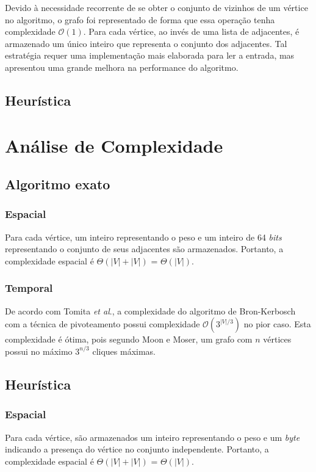 \documentclass{article}
\begin{document}
Devido à necessidade recorrente de se obter o conjunto de vizinhos de um vértice no algoritmo, o grafo foi representado de forma que essa operação tenha complexidade $\mathcal{O}(1)$. Para cada vértice, ao invés de uma lista de adjacentes, é armazenado um único inteiro que representa o conjunto dos adjacentes. Tal estratégia requer uma implementação mais elaborada para ler a entrada, mas apresentou uma grande melhora na performance do algoritmo.

\subsection{Heurística}


\pagebreak


\section{Análise de Complexidade}

\subsection{Algoritmo exato}
\subsubsection{Espacial}
Para cada vértice, um inteiro representando o peso e um inteiro de 64 \textit{bits} representando o conjunto de seus adjacentes são armazenados. Portanto, a complexidade espacial é $\Theta(|V| + |V|)$ = $\Theta(|V|)$.
\subsubsection{Temporal}
De acordo com Tomita \textit{et al}.\cite{TOMITA200628}, a complexidade do algoritmo de Bron-Kerbosch com a técnica de \mbox{pivoteamento} possui complexidade $\mathcal{O}(3^{|V|/3})$ no pior caso. Esta complexidade é ótima, pois segundo Moon e Moser\cite{Moon1965}, um grafo com $n$ vértices possui no máximo $3^{n/3}$ cliques máximas.

\subsection{Heurística}
\subsubsection{Espacial}
Para cada vértice, são armazenados um inteiro representando o peso e um \textit{byte} indicando a presença do vértice no conjunto independente. Portanto, a complexidade espacial é $\Theta(|V| + |V|)$ = $\Theta(|V|)$.
\end{document}
